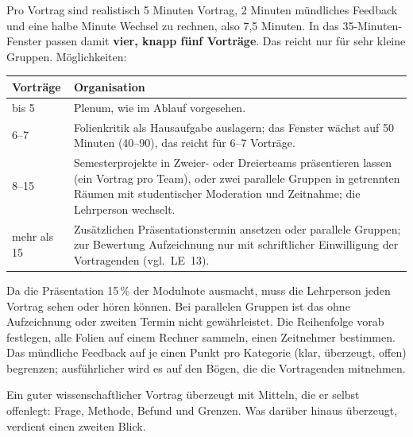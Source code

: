 \begin{lehrhinweis}
Pro Vortrag sind realistisch 5 Minuten Vortrag, 2 Minuten mündliches
Feedback und eine halbe Minute Wechsel zu rechnen, also 7,5 Minuten. In
das 35-Minuten-Fenster passen damit \textbf{vier, knapp fünf Vorträge}.
Das reicht nur für sehr kleine Gruppen. Möglichkeiten:

\begin{center}\small
\begin{tabular}{p{}p{}}
\toprule
\textbf{Vorträge} & \textbf{Organisation} \\
\midrule
bis 5 & Plenum, wie im Ablauf vorgesehen. \\
6--7 & Folienkritik als Hausaufgabe auslagern; das Fenster wächst auf
  50 Minuten (40--90), das reicht für 6--7 Vorträge. \\
8--15 & Semesterprojekte in Zweier- oder Dreierteams präsentieren lassen
  (ein Vortrag pro Team), oder zwei parallele Gruppen in getrennten Räumen
  mit studentischer Moderation und Zeitnahme; die Lehrperson wechselt. \\
mehr als 15 & Zusätzlichen Präsentationstermin ansetzen oder parallele
  Gruppen; zur Bewertung Aufzeichnung nur mit schriftlicher Einwilligung
  der Vortragenden (vgl.\ LE~13). \\
\bottomrule
\end{tabular}
\end{center}

Da die Präsentation 15\,\% der Modulnote ausmacht, muss die Lehrperson
jeden Vortrag sehen oder hören können. Bei parallelen Gruppen ist das ohne
Aufzeichnung oder zweiten Termin nicht gewährleistet. Die Reihenfolge vorab
festlegen, alle Folien auf einem Rechner sammeln, einen Zeitnehmer bestimmen.
Das mündliche Feedback auf je einen Punkt pro Kategorie (klar, überzeugt,
offen) begrenzen; ausführlicher wird es auf den Bögen, die die Vortragenden
mitnehmen.
\end{lehrhinweis}

\begin{merkbox}
Ein guter wissenschaftlicher Vortrag überzeugt mit Mitteln, die er selbst
offenlegt: Frage, Methode, Befund und Grenzen. Was darüber hinaus
überzeugt, verdient einen zweiten Blick.
\end{merkbox}
\os{\newpage}

